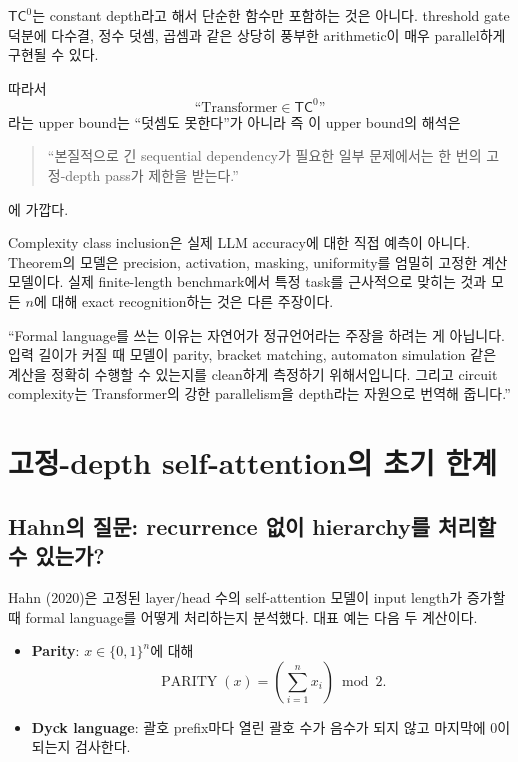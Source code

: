 \documentclass[11pt,a4paper,oneside,openany]{memoir}
\theoremstyle{definition}
\newcommand{\bits}{\{0,1\}}
\newcommand{\TC}{\mathsf{TC}}
\begin{document}
$\TC^0$는 constant depth라고 해서 단순한 함수만 포함하는 것은 아니다.
threshold gate 덕분에 다수결, 정수 덧셈, 곱셈과 같은 상당히 풍부한 arithmetic이 매우 parallel하게 구현될 수 있다.

따라서
\[
\text{``Transformer}\in\TC^0\text{''}
\]
라는 upper bound는 ``덧셈도 못한다''가 아니라
즉 이 upper bound의 해석은
\begin{quote}
``본질적으로 긴 sequential dependency가 필요한 일부 문제에서는
한 번의 고정-depth pass가 제한을 받는다.''
\end{quote}
에 가깝다.

\begin{warningbox}
Complexity class inclusion은 실제 LLM accuracy에 대한 직접 예측이 아니다. Theorem의 모델은 precision, activation, masking, uniformity를 엄밀히 고정한 계산 모델이다. 실제 finite-length benchmark에서 특정 task를 근사적으로 맞히는 것과 모든 $n$에 대해 exact recognition하는 것은 다른 주장이다.
\end{warningbox}

\begin{presentbox}
``Formal language를 쓰는 이유는 자연어가 정규언어라는 주장을 하려는 게 아닙니다. 입력 길이가 커질 때 모델이 parity, bracket matching, automaton simulation 같은 계산을 정확히 수행할 수 있는지를 clean하게 측정하기 위해서입니다. 그리고 circuit complexity는 Transformer의 강한 parallelism을 depth라는 자원으로 번역해 줍니다.''
\end{presentbox}

\chapter{고정-depth self-attention의 초기 한계}

\section{Hahn의 질문: recurrence 없이 hierarchy를 처리할 수 있는가?}

Hahn (2020)은 고정된 layer/head 수의 self-attention 모델이 input length가 증가할 때
formal language를 어떻게 처리하는지 분석했다. 대표 예는 다음 두 계산이다.

\begin{itemize}
  \item \textbf{Parity}: $x\in\bits^n$에 대해
  \[
  \operatorname{PARITY}(x)=\left(\sum_{i=1}^n x_i\right)\bmod 2.
  \]
  \item \textbf{Dyck language}: 괄호 prefix마다 열린 괄호 수가 음수가 되지 않고 마지막에 0이 되는지 검사한다.
\end{itemize}
\end{document}
